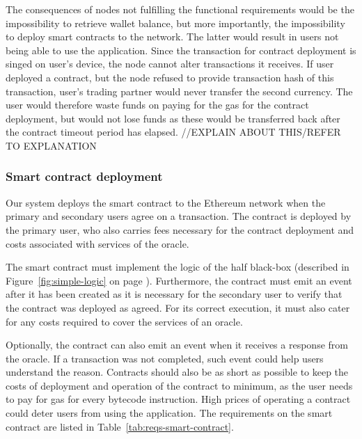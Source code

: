 The consequences of nodes not fulfilling the functional requirements would be the impossibility to retrieve wallet balance, but more importantly, the impossibility to deploy smart contracts to the network. The latter would result in users not being able to use the application. Since the transaction for contract deployment is singed on user’s device, the node cannot alter transactions it receives. If user deployed a contract, but the node refused to provide transaction hash of this transaction, user’s trading partner would never transfer the second currency. The user would therefore waste funds on paying for the gas for the contract deployment, but would not lose funds as these would be transferred back after the contract timeout period has elapsed. //EXPLAIN ABOUT THIS/REFER TO EXPLANATION

\subsubsection{Smart contract deployment}
Our system deploys the smart contract to the Ethereum network when the primary and secondary users agree on a transaction. The contract is deployed by the primary user, who also carries fees necessary for the contract deployment and costs associated with services of the oracle\footnotemark.
% 

The smart contract must implement the logic of the half black-box (described in Figure~\ref{fig:simple-logic} on page \pageref{fig:simple-logic}). Furthermore, the contract must emit an event after it has been created as it is necessary for the secondary user to verify that the contract was deployed as agreed. For its correct execution, it must also cater for any costs required to cover the services of an oracle.

Optionally, the contract can also emit an event when it receives a response from the oracle. If a transaction was not completed, such event could help users understand the reason. Contracts should also be as short as possible to keep the costs of deployment and operation of the contract to minimum, as the user needs to pay for gas for every bytecode instruction. High prices of operating a contract could deter users from using the application. The requirements on the smart contract are listed in Table~\ref{tab:reqs-smart-contract}.

